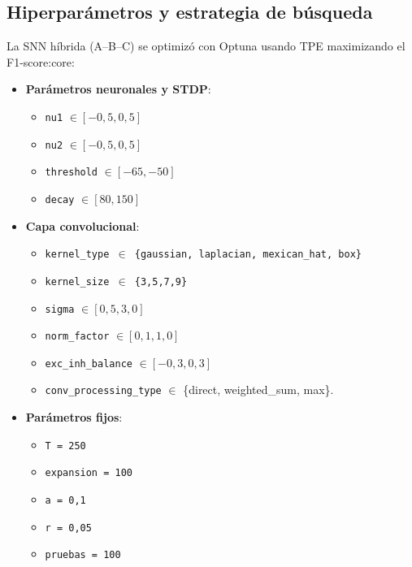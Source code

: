 \subsection{Hiperparámetros y estrategia de búsqueda}
La SNN híbrida (A--B--C) se optimizó con Optuna usando TPE maximizando el F1-score:core:
\begin{itemize}
    \item \textbf{Parámetros neuronales y STDP}:
    \begin{itemize}
        \item \texttt{nu1} \(\in [-0{,}5, 0{,}5]\)
        \item \texttt{nu2} \(\in [-0{,}5, 0{,}5]\)
        \item \texttt{threshold} \(\in [-65, -50]\)
        \item \texttt{decay} \(\in [80, 150]\)
    \end{itemize}
    \item \textbf{Capa convolucional}:
    \begin{itemize}
        \item \texttt{kernel\_type \(\in\) \{gaussian, laplacian, mexican\_hat, box\}}
        \item \texttt{kernel\_size \(\in\) \{3,5,7,9\}}
        \item \texttt{sigma} \(\in [0{,}5, 3{,}0]\)
        \item \texttt{norm\_factor} \(\in [0{,}1, 1{,}0]\)
        \item \texttt{exc\_inh\_balance} \(\in [-0{,}3, 0{,}3]\)
        \item \texttt{conv\_processing\_type} \(\in\) \{direct, weighted\_sum, max\}.
    \end{itemize}
    \item \textbf{Parámetros fijos}: 
     \begin{itemize}
        \item  \texttt{T = 250}
        \item \texttt{expansion = 100}
        \item \texttt{a = 0{,}1}
        \item \texttt{r = 0{,}05}
        \item \texttt{pruebas = 100}
    \end{itemize}
\end{itemize}
